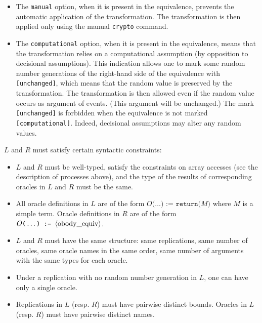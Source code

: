 \begin{itemize}
\begin{itemize}
\item The \texttt{manual} option, when it is present in the equivalence,
prevents the automatic application of the transformation. The transformation
is then applied only using the manual \texttt{crypto} command.

\item The \texttt{computational} option, when it is present in the 
equivalence, means that the transformation relies on a computational assumption
(by opposition to decisional assumptions). This indication allows one to mark
some random number generations of the right-hand side of the equivalence with
\texttt{[unchanged]}, which means that the random value is preserved by 
the transformation. The transformation is then allowed even if the random 
value occurs as argument of events. (This argument will be unchanged.)
The mark \texttt{[unchanged]} is forbidden when the equivalence is
not marked \texttt{[computational]}. Indeed, decisional assumptions may
alter any random values.

\end{itemize}

$L$ and $R$ must satisfy certain syntactic constraints:
\begin{itemize}

\item %
$L$ and $R$ must be well-typed, satisfy the constraints on
array accesses (see the description of processes above), 
and the type of the results of 
corresponding oracles in $L$ and $R$ must be the same.

\item All oracle definitions in $L$ are of the form 
$O\texttt{(}\ldots\texttt{) := return(}M\texttt{)}$
where $M$ is a simple term. %
Oracle definitions in $R$ are of the form 
$O\texttt{(}\ldots\texttt{) := }\langle\textrm{obody\_equiv}\rangle$.

\item $L$ and $R$ must have the same structure: same replications,
same number of oracles, same oracle names in the same order,
same number of arguments with the same types for each oracle.

\item Under a replication with no random number generation in $L$, 
one can have only a single oracle.

\item Replications in $L$ (resp. $R$) must have pairwise distinct
bounds. Oracles in $L$ (resp. $R$) must have pairwise distinct names.


\end{itemize}
\end{itemize}
